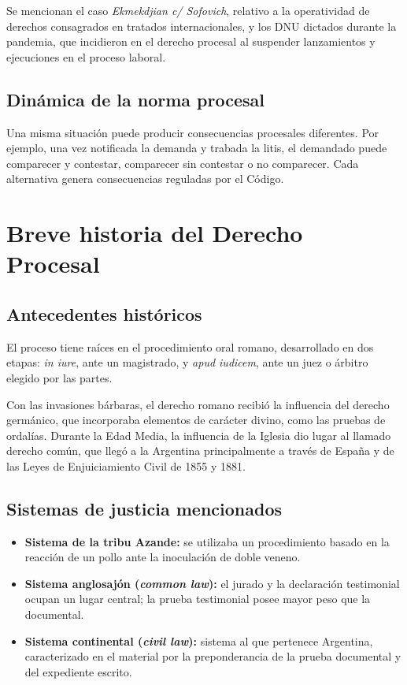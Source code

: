 \documentclass[12pt,oneside]{book}
\begin{document}
Se mencionan el caso \textit{Ekmekdjian c/ Sofovich}, relativo a la operatividad de derechos consagrados en tratados internacionales, y los DNU dictados durante la pandemia, que incidieron en el derecho procesal al suspender lanzamientos y ejecuciones en el proceso laboral.

\section{Dinámica de la norma procesal}
Una misma situación puede producir consecuencias procesales diferentes. Por ejemplo, una vez notificada la demanda y trabada la litis, el demandado puede comparecer y contestar, comparecer sin contestar o no comparecer. Cada alternativa genera consecuencias reguladas por el Código.

\chapter{Breve historia del Derecho Procesal}
\section{Antecedentes históricos}
El proceso tiene raíces en el procedimiento oral romano, desarrollado en dos etapas: \textit{in iure}, ante un magistrado, y \textit{apud iudicem}, ante un juez o árbitro elegido por las partes.

Con las invasiones bárbaras, el derecho romano recibió la influencia del derecho germánico, que incorporaba elementos de carácter divino, como las pruebas de ordalías. Durante la Edad Media, la influencia de la Iglesia dio lugar al llamado derecho común, que llegó a la Argentina principalmente a través de España y de las Leyes de Enjuiciamiento Civil de 1855 y 1881.

\section{Sistemas de justicia mencionados}
\begin{itemize}
\item \textbf{Sistema de la tribu Azande:} se utilizaba un procedimiento basado en la reacción de un pollo ante la inoculación de doble veneno.
\item \textbf{Sistema anglosajón (\textit{common law}):} el jurado y la declaración testimonial ocupan un lugar central; la prueba testimonial posee mayor peso que la documental.
\item \textbf{Sistema continental (\textit{civil law}):} sistema al que pertenece Argentina, caracterizado en el material por la preponderancia de la prueba documental y del expediente escrito.
\end{itemize}
\end{document}
